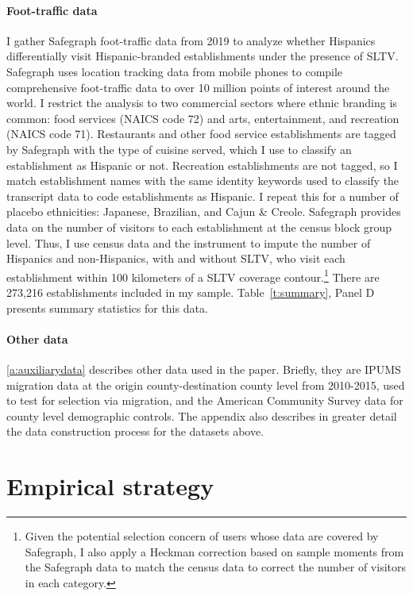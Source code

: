 \documentclass[11pt]{article}
\begin{document}
\paragraph{Foot-traffic data} I gather Safegraph foot-traffic data from 2019 to analyze whether Hispanics differentially visit Hispanic-branded establishments under the presence of SLTV. Safegraph uses location tracking data from mobile phones to compile comprehensive foot-traffic data to over 10 million points of interest around the world. I restrict the analysis to two commercial sectors where ethnic branding is common: food services (NAICS code 72) and arts, entertainment, and recreation (NAICS code 71). Restaurants and other food service establishments are tagged by Safegraph with the type of cuisine served, which I use to classify an establishment as Hispanic or not. Recreation establishments are not tagged, so I match establishment names with the same identity keywords used to classify the transcript data to code establishments as Hispanic. I repeat this for a number of placebo ethnicities: Japanese, Brazilian, and Cajun \& Creole. Safegraph provides data on the number of visitors to each establishment at the census block group level. Thus, I use census data and the instrument to impute the number of Hispanics and non-Hispanics, with and without SLTV, who visit each establishment within 100 kilometers of a SLTV coverage contour.\footnote{ Given the potential selection concern of users whose data are covered by Safegraph, I also apply a Heckman correction based on sample moments from the Safegraph data to match the census data to correct the number of visitors in each category.} There are 273,216 establishments included in my sample. Table~\ref{t:summary}, Panel D presents summary statistics for this data. 

\paragraph{Other data} \ref{a:auxiliarydata} describes other data used in the paper. Briefly, they are IPUMS migration data at the origin county-destination county level from 2010-2015, used to test for selection via migration, and the American Community Survey data for county level demographic controls. The appendix also describes in greater detail the data construction process for the datasets above.



\section{Empirical strategy}\label{s:rd}
\end{document}
